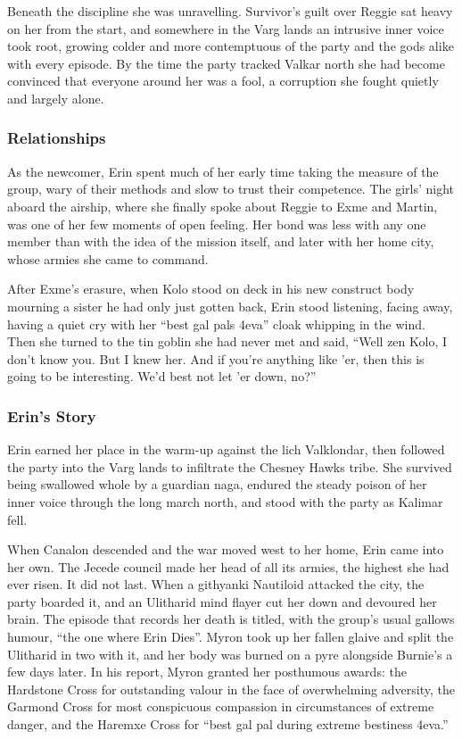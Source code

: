 Beneath the discipline she was unravelling. Survivor's guilt over Reggie sat heavy on her from the start, and somewhere in the Varg lands an intrusive inner voice took root, growing colder and more contemptuous of the party and the gods alike with every episode. By the time the party tracked Valkar north she had become convinced that everyone around her was a fool, a corruption she fought quietly and largely alone.

\subsubsection{Relationships}

As the newcomer, Erin spent much of her early time taking the measure of the group, wary of their methods and slow to trust their competence. The girls' night aboard the airship, where she finally spoke about Reggie to Exme and Martin, was one of her few moments of open feeling. Her bond was less with any one member than with the idea of the mission itself, and later with her home city, whose armies she came to command.

After Exme's erasure, when Kolo stood on deck in his new construct body mourning a sister he had only just gotten back, Erin stood listening, facing away, having a quiet cry with her ``best gal pals 4eva'' cloak whipping in the wind.  Then she turned to the tin goblin she had never met and said, ``Well zen Kolo, I don't know you.  But I knew her.  And if you're anything like 'er, then this is going to be interesting.  We'd best not let 'er down, no?''

\subsubsection{Erin's Story}

Erin earned her place in the warm-up against the lich Valklondar, then followed the party into the Varg lands to infiltrate the Chesney Hawks tribe. She survived being swallowed whole by a guardian naga, endured the steady poison of her inner voice through the long march north, and stood with the party as Kalimar fell.

When Canalon descended and the war moved west to her home, Erin came into her own. The Jecede council made her head of all its armies, the highest she had ever risen. It did not last. When a githyanki Nautiloid attacked the city, the party boarded it, and an Ulitharid mind flayer cut her down and devoured her brain. The episode that records her death is titled, with the group's usual gallows humour, ``the one where Erin Dies''. Myron took up her fallen glaive and split the Ulitharid in two with it, and her body was burned on a pyre alongside Burnie's a few days later.  In his report, Myron granted her posthumous awards: the Hardstone Cross for outstanding valour in the face of overwhelming adversity, the Garmond Cross for most conspicuous compassion in circumstances of extreme danger, and the Haremxe Cross for ``best gal pal during extreme bestiness 4eva.''

\clearpage
